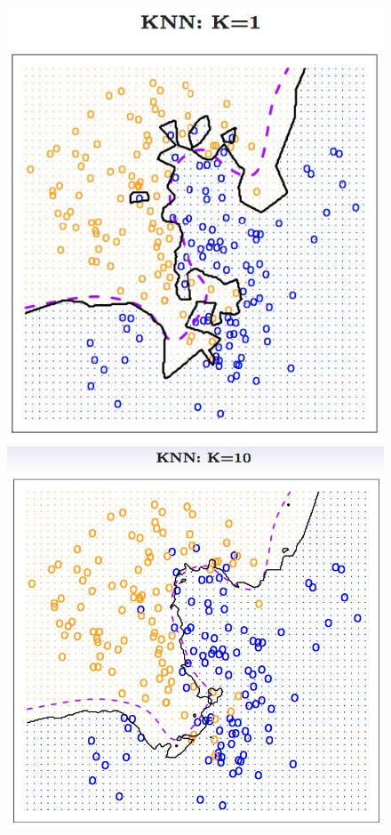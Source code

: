 \documentclass[twoside]{article}
\begin{document}
\begin{figure}[H]
  \centering
  \begin{minipage}[b]{0.25\textwidth}
    \includegraphics[width=\textwidth]{pics/lecture_8_knn_1.jpg}
  \end{minipage}
  \hfill
  \begin{minipage}[b]{0.25\textwidth}
    \includegraphics[width=\textwidth]{pics/lecture_8_knn_10.jpg}

\end{minipage}
\end{figure}
\end{document}
